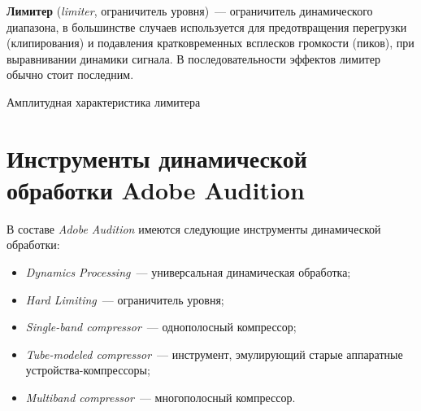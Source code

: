 \documentclass{beamer}
\begin{document}
\begin{frame}
  \textbf{Лимитер} (\emph{limiter}, ограничитель уровня)~--- ограничитель динамического диапазона, в большинстве случаев используется для предотвращения перегрузки (клипирования) и подавления кратковременных всплесков громкости (пиков), при выравнивании динамики сигнала. В последовательности эффектов лимитер обычно стоит последним.

  \begin{block} {Амплитудная характеристика лимитера}
  \end{block}
\end{frame}

\section[Adobe Audition]{Инструменты динамической обработки Adobe Audition}
\begin{frame}
  В составе \emph{Adobe Audition} имеются следующие инструменты динамической обработки:
  \begin{itemize}
    \item \emph{Dynamics Processing}~--- универсальная динамическая обработка;
    \item \emph{Hard Limiting}~--- ограничитель уровня;
    \item \emph{Single-band compressor}~--- однополосный компрессор;
    \item \emph{Tube-modeled compressor}~--- инструмент, эмулирующий старые аппаратные устройства-компрессоры;
    \item \emph{Multiband compressor}~--- многополосный компрессор.
  \end{itemize}
\end{frame}
\end{document}
